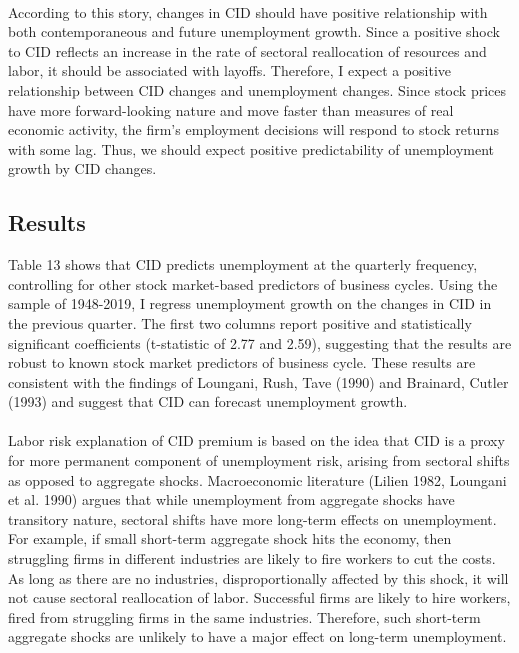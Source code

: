 \documentclass[12pt]{article}
\begin{document}
\paragraph{}
According to this story, changes in CID should have positive relationship with both contemporaneous and future unemployment growth. Since a positive shock to CID reflects an increase in the rate of sectoral reallocation of resources and labor, it should be associated with layoffs. Therefore, I expect a positive relationship between CID changes and unemployment changes. Since stock prices have more forward-looking nature and move faster than measures of real economic activity, the firm's employment decisions will respond to stock returns with some lag. Thus, we should expect positive predictability of unemployment growth by CID changes.

\subsection{Results}

Table 13 shows that CID predicts unemployment at the quarterly frequency, controlling for other stock market-based predictors of business cycles.
Using the sample of 1948-2019, I regress unemployment growth on the changes in CID in the previous quarter. The first two columns report positive and statistically significant coefficients (t-statistic of 2.77 and 2.59), suggesting that the results are robust to known stock market predictors of business cycle. These results are consistent with the findings of Loungani, Rush, Tave (1990) and Brainard, Cutler (1993) and suggest that CID can forecast unemployment growth. 
\paragraph{}
Labor risk explanation of CID premium is based on the idea that CID is a proxy for more permanent component of unemployment risk, arising from sectoral shifts as opposed to aggregate shocks. Macroeconomic literature (Lilien 1982, Loungani et al. 1990) argues that while unemployment from aggregate shocks have transitory nature, sectoral shifts have more long-term effects on unemployment. For example, if small short-term aggregate shock hits the economy, then struggling firms in different industries are likely to fire workers to cut the costs. As long as there are no industries, disproportionally affected by this shock, it will not cause sectoral reallocation of labor. Successful firms are likely to hire workers, fired from struggling firms in the same industries. Therefore, such short-term aggregate shocks are unlikely to have a major effect on long-term unemployment.
\end{document}
